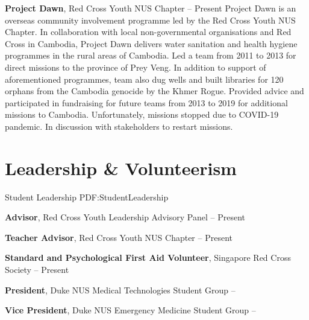 \documentclass[letterpaper,10pt,oneside]{article}
\begin{document}
\begin{body}
\textbf{Project Dawn}, Red Cross Youth NUS Chapter
\hfill
{} -- Present
\BulletItem Project Dawn is an overseas community involvement programme led by the Red Cross Youth NUS Chapter. In collaboration with local non-governmental organisations and Red Cross in Cambodia, Project Dawn delivers water sanitation and health hygiene programmes in the rural areas of Cambodia.
\BulletItem Led a team from 2011 to 2013 for direct missions to the province of Prey Veng. In addition to support of aforementioned programmes, team also dug wells and built libraries for 120 orphans from the Cambodia genocide by the Khmer Rogue.
\BulletItem Provided advice and participated in fundraising for future teams from 2013 to 2019 for additional missions to Cambodia. Unfortunately, missions stopped due to COVID-19 pandemic. In discussion with stakeholders to restart missions.





\section
{Leadership \& Volunteerism}
{Student Leadership}
{PDF:StudentLeadership}

\textbf{Advisor}, Red Cross Youth Leadership Advisory Panel
\hfill
{} -- Present
\GapNoBreak

\textbf{Teacher Advisor}, Red Cross Youth NUS Chapter
\hfill
{} -- Present
\GapNoBreak

\textbf{Standard and Psychological First Aid Volunteer}, Singapore Red Cross Society
\hfill
{} -- Present
\GapNoBreak

\textbf{President}, Duke NUS Medical Technologies Student Group
\hfill
{} --  
\GapNoBreak

\textbf{Vice President}, Duke NUS Emergency Medicine Student Group
\hfill
{} --  
\GapNoBreak


\end{body}
\end{document}
